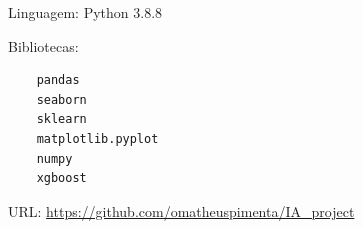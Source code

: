 \documentclass[
	article,			%
	11pt,				%
	oneside,			%
	a4paper,			%
	english,			%
	brazil,				%
	sumario=tradicional
	]{abntex2}
\begin{document}

\frenchspacing 


%
%

\maketitle





\begin{resumoumacoluna}
 Linguagem: Python $3.8.8$
 
 Bibliotecas:
 \begin{verbatim}
    pandas
    seaborn
    sklearn
    matplotlib.pyplot
    numpy
    xgboost
 \end{verbatim}

 URL: \url{https://github.com/omatheuspimenta/IA_project}
 
 
\end{resumoumacoluna}


% 
%  


% 
\end{document}
